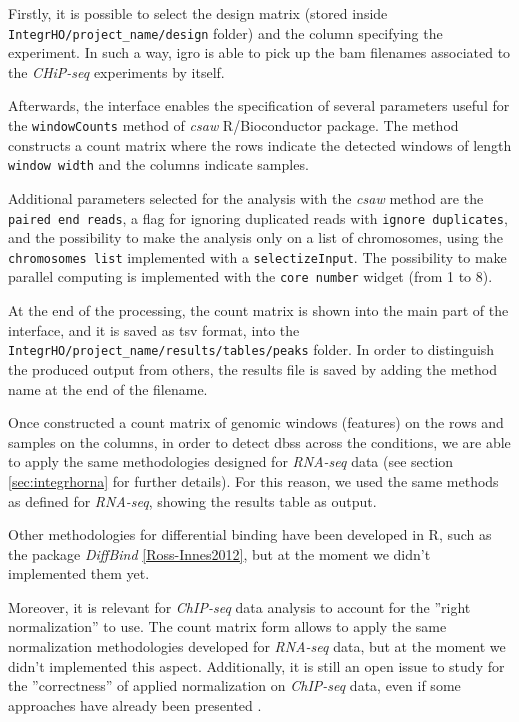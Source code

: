 Firstly, it is possible to select the design matrix (stored inside \lstinline!IntegrHO/project_name/design! folder) and the column specifying the experiment.
In such a way, \gls{igro} is able to pick up the \gls{bam} filenames associated to the \textit{CHiP-seq} experiments by itself.

Afterwards, the interface enables the specification of several parameters useful for the \lstinline!windowCounts! method of \textit{csaw} R/Bioconductor package.
The method constructs a count matrix where the rows indicate the detected windows of length \lstinline!window width! and the columns indicate samples.

Additional parameters selected for the analysis with the \textit{csaw} method are the \lstinline!paired end reads!, a flag for ignoring duplicated reads with \lstinline!ignore duplicates!, and the possibility to make the analysis only on a list of chromosomes, using the \lstinline!chromosomes list! implemented with a \lstinline!selectizeInput!.
The possibility to make parallel computing is implemented with the \lstinline!core number! widget (from 1 to 8).

At the end of the processing, the count matrix is shown into the main part of the interface, and it is saved as \gls{tsv} format, into the \lstinline!IntegrHO/project_name/results/tables/peaks! folder.
In order to distinguish the produced output from others, the results file is saved by adding the method name at the end of the filename.

Once constructed a count matrix of genomic windows (features) on the rows and samples on the columns, in order to detect \glspl{dbs} across the conditions, we are able to apply the same methodologies designed for \textit{RNA-seq} data (see section \ref{sec:integrhorna} for further details).
For this reason, we used the same methods as defined for \textit{RNA-seq}, showing the results table as output.

Other methodologies for differential binding have been developed in R, such as the package \textit{DiffBind} \ref{Ross-Innes2012}, but at the moment we didn't implemented them yet.

Moreover, it is relevant for \textit{ChIP-seq} data analysis to account for the ''right normalization'' to use.
The count matrix form allows to apply the same normalization methodologies developed for \textit{RNA-seq} data, but at the moment we didn't implemented this aspect.
Additionally, it is still an open issue to study for the ''correctness'' of applied normalization on \textit{ChIP-seq} data, even if some approaches have already been presented \cite{Angelini2015}.


